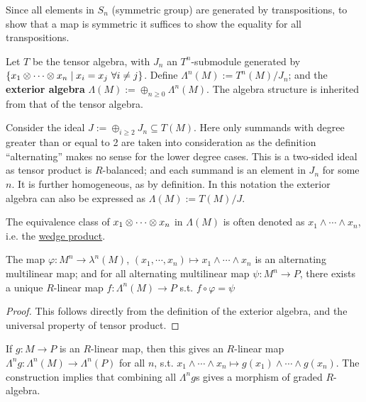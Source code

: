 \documentclass{article}
\begin{document}
\begin{remark}
    Since all elements in $S_n$ (symmetric group) are generated by transpositions, to show that a map is symmetric it suffices to show the equality for all transpositions.
\end{remark}

\begin{definition}
    Let $T$ be the tensor algebra, with $J_n$ an $T^n$-submodule generated by $\{x_1 \otimes \cdots \otimes x_n \mid x_i = x_j\ \forall i \neq j\}$. Define $\Lambda^n(M) := T^n(M) / J_n$; and the \textbf{exterior algebra} $\Lambda(M) := \oplus_{n \geq 0} \Lambda^n(M)$. The algebra structure is inherited from that of the tensor algebra. 
\end{definition}

\begin{remark}
    Consider the ideal $J := \oplus_{i \geq 2} J_n \subseteq T(M)$. Here only summands with degree greater than or equal to 2 are taken into consideration as the definition ``alternating'' makes no sense for the lower degree cases. This is a two-sided ideal as tensor product is $R$-balanced; and each summand is an element in $J_n$ for some $n$. It is further homogeneous, as by definition. In this notation the exterior algebra can also be expressed as $\Lambda(M) := T(M)/J$.
\end{remark}

\begin{remark}
    The equivalence class of $x_1 \otimes \cdots \otimes x_n$ in $\Lambda(M)$ is often denoted as $x_1 \wedge \cdots \wedge x_n$, i.e. the \underline{wedge product}.
\end{remark}

\begin{proposition}
    The map $\varphi: M^n \to \lambda^n(M)$, $(x_1, \cdots, x_n) \mapsto x_1 \wedge \cdots \wedge x_n$ is an alternating multilinear map; and for all alternating multilinear map $\psi: M^n \to P$, there exists a unique $R$-linear map $f: \Lambda^n(M) \to P$ s.t. $f \circ \varphi = \psi$
\end{proposition}

\begin{proof}
    This follows directly from the definition of the exterior algebra, and the universal property of tensor product.
\end{proof}

\begin{example}
    If $g: M \to P$ is an $R$-linear map, then this gives an $R$-linear map $\Lambda^n g: \Lambda^n(M) \to \Lambda^n(P)$ for all $n$, s.t. $x_1 \wedge \cdots \wedge x_n \mapsto g(x_1) \wedge \cdots \wedge g(x_n)$. The construction implies that combining all $\Lambda^n g$s gives a morphism of graded $R$-algebra. 
\end{example}
\end{document}

